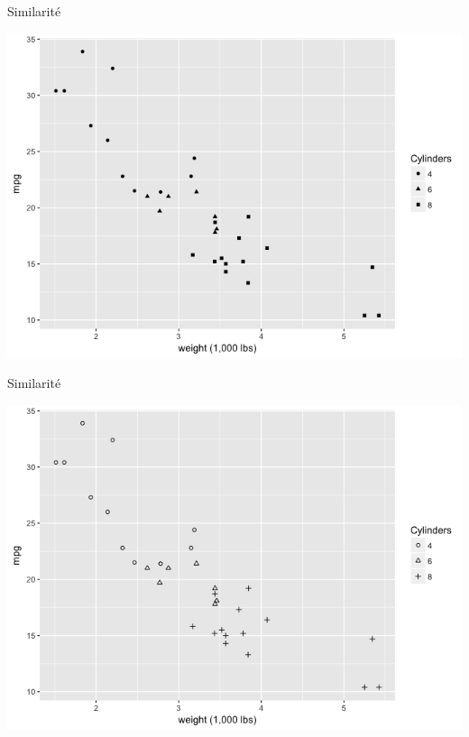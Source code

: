 \documentclass[french]{beamer}
\begin{document}
\begin{frame}{Similarité}
\begin{center}
	\includegraphics[height=0.8\textheight]{sim3}
\end{center}
\end{frame}

\begin{frame}{Similarité}
\begin{center}
	\includegraphics[height=0.8\textheight]{sim4}
\end{center}
\end{frame}
\end{document}
